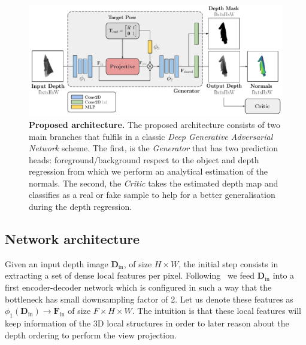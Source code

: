\begin{figure}[t!]
    \centering
    \includegraphics[width=\textwidth]{main/chapter04/data/ipalm_cvpr_architecture.pdf}
    \caption{\small{\textbf{Proposed architecture.} The proposed architecture consists of two main branches that fulfils in a classic \textit{Deep Generative Adversarial Network} scheme. The first, is the \textit{Generator} that has two prediction heads: foreground/background respect to the object and depth regression from which we perform an analytical estimation of the normals. The second, the \textit{Critic} takes the estimated depth map and classifies as a real or fake sample to help for a better generalisation during the depth regression.}}
    \label{fig_architecture}
\end{figure}

\subsection{Network architecture}
Given an input depth image $\mathbf{D}_{\textrm{in}}$, of size $H\times W$, the initial step consists in extracting a set of dense local features per pixel. Following~\cite{pix2pix2017} we feed $\mathbf{D}_{\textrm{in}}$ into a first encoder-decoder network which is configured in such  a way that the bottleneck has  small downsampling factor of 2. Let us denote these features as $\phi_1(\mathbf{D}_{\textrm{in}}) \rightarrow \mathbf{F}_{\textrm{in}}$ of size $F\times H \times W$. The intuition is that these local features will keep information of the 3D local structures in order to later reason about the depth ordering to perform the view projection.

